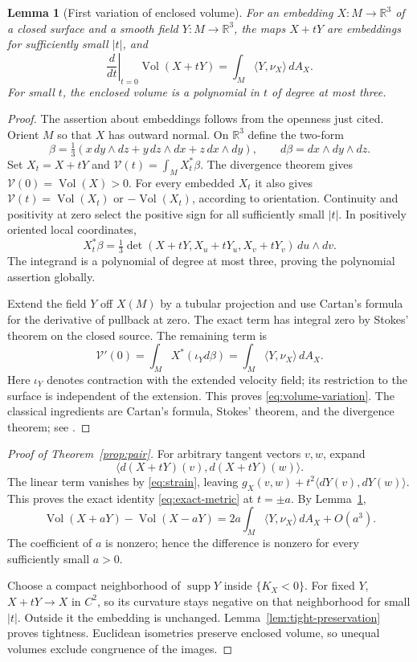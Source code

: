 \documentclass[11pt]{amsart}
\newtheorem{lemma}[theorem]{Lemma}
\theoremstyle{definition}
\newcommand{\R}{\mathbb R}
\DeclareMathOperator{\supp}{supp}
\DeclareMathOperator{\Vol}{Vol}
\begin{document}
\begin{lemma}[First variation of enclosed volume]\label{lem:volume}
For an embedding $X:M\to\R^3$ of a closed surface and a smooth field
$Y:M\to\R^3$, the maps $X+tY$ are embeddings for sufficiently small
$|t|$, and
\begin{equation}\label{eq:volume-variation}
 \left.\frac{d}{dt}\right|_{t=0}\Vol(X+tY)
 =\int_M\langle Y,\nu_X\rangle\,dA_X.
\end{equation}
For small $t$, the enclosed volume is a polynomial in $t$ of degree
at most three.
\end{lemma}
\begin{proof}
The assertion about embeddings follows from the openness just cited.
Orient $M$ so that $X$ has outward normal. On $\R^3$ define the
two-form
\[
 \beta=\tfrac13(x\,dy\wedge dz+y\,dz\wedge dx+z\,dx\wedge dy),
 \qquad d\beta=dx\wedge dy\wedge dz.
\]
Set $X_t=X+tY$ and $\mathcal V(t)=\int_M X_t^*\beta$.
The divergence theorem gives $\mathcal V(0)=\Vol(X)>0$.
For every embedded $X_t$ it also gives
$\mathcal V(t)=\Vol(X_t)$ or $-\Vol(X_t)$, according to orientation.
Continuity and positivity at zero select the positive sign for
all sufficiently small $|t|$.
In positively oriented local coordinates,
\[
 X_t^*\beta=\tfrac13
       \det(X+tY,X_u+tY_u,X_v+tY_v)\,du\wedge dv.
\]
The integrand is a polynomial of degree at most three, proving
the polynomial assertion globally.

Extend the field $Y$ off $X(M)$ by a tubular projection and use
Cartan's formula for the derivative of pullback at zero.
The exact term has integral zero by Stokes' theorem on the
closed source. The remaining term is
\[
 \mathcal V'(0)=\int_M X^*(\iota_Y d\beta)
       =\int_M\langle Y,\nu_X\rangle\,dA_X.
\]
Here $\iota_Y$ denotes contraction with the extended velocity field;
its restriction to the surface is independent of the extension.
This proves \eqref{eq:volume-variation}. The classical ingredients
are Cartan's formula, Stokes' theorem, and the divergence theorem;
see \cite[Theorem~14.35 and Chapter~16, including Theorem~16.32]{Lee}.
\end{proof}

\begin{proof}[Proof of Theorem~\ref{prop:pair}]
For arbitrary tangent vectors $v,w$, expand
\[
 \langle d(X+tY)(v),d(X+tY)(w)\rangle.
\]
The linear term vanishes by \eqref{eq:strain}, leaving
$g_X(v,w)+t^2\langle dY(v),dY(w)\rangle$. This proves the exact
identity \eqref{eq:exact-metric} at $t=\pm a$.
By Lemma~\ref{lem:volume},
\begin{equation}\label{eq:odd-volume}
 \Vol(X+aY)-\Vol(X-aY)
 =2a\int_M\langle Y,\nu_X\rangle\,dA_X+O(a^3).
\end{equation}
The coefficient of $a$ is nonzero; hence the difference is nonzero
for every sufficiently small $a>0$.

Choose a compact neighborhood of $\supp Y$ inside $\{K_X<0\}$.
For fixed $Y$, $X+tY\to X$ in $C^2$, so its curvature stays negative
on that neighborhood for small $|t|$. Outside it the embedding is
unchanged. Lemma~\ref{lem:tight-preservation} proves tightness.
Euclidean isometries preserve enclosed volume, so unequal volumes
exclude congruence of the images.
\end{proof}
\end{document}
